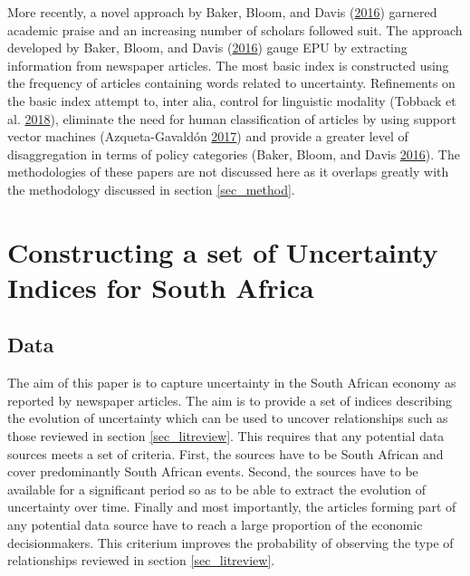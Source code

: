 \documentclass[11pt,preprint, authoryear]{elsarticle}
\numberwithin{equation}{section}
\numberwithin{figure}{section}
\numberwithin{table}{section}
\begin{document}
More recently, a novel approach by Baker, Bloom, and Davis
(\protect\hyperlink{ref-Baker2016}{2016}) garnered academic praise and
an increasing number of scholars followed suit. The approach developed
by Baker, Bloom, and Davis (\protect\hyperlink{ref-Baker2016}{2016})
gauge EPU by extracting information from newspaper articles. The most
basic index is constructed using the frequency of articles containing
words related to uncertainty. Refinements on the basic index attempt to,
inter alia, control for linguistic modality (Tobback et al.
\protect\hyperlink{ref-Tobback2018}{2018}), eliminate the need for human
classification of articles by using support vector machines
(Azqueta-Gavaldón \protect\hyperlink{ref-Azqueta-Gavaldon2017}{2017})
and provide a greater level of disaggregation in terms of policy
categories (Baker, Bloom, and Davis
\protect\hyperlink{ref-Baker2016}{2016}). The methodologies of these
papers are not discussed here as it overlaps greatly with the
methodology discussed in section \ref{sec_method}.

\section{\texorpdfstring{Constructing a set of Uncertainty Indices for
South Africa
\label{sec_EPU}}{Constructing a set of Uncertainty Indices for South Africa }}\label{constructing-a-set-of-uncertainty-indices-for-south-africa}

\subsection{\texorpdfstring{Data \label{sec_data}}{Data }}\label{data}

The aim of this paper is to capture uncertainty in the South African
economy as reported by newspaper articles. The aim is to provide a set
of indices describing the evolution of uncertainty which can be used to
uncover relationships such as those reviewed in section
\ref{sec_litreview}. This requires that any potential data sources meets
a set of criteria. First, the sources have to be South African and cover
predominantly South African events. Second, the sources have to be
available for a significant period so as to be able to extract the
evolution of uncertainty over time. Finally and most importantly, the
articles forming part of any potential data source have to reach a large
proportion of the economic decisionmakers. This criterium improves the
probability of observing the type of relationships reviewed in section
\ref{sec_litreview}.
\end{document}
